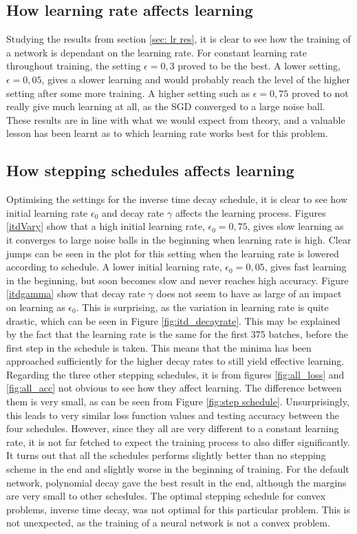 \documentclass{article}
\begin{document}
\subsection{How learning rate affects learning}
Studying the results from section \ref{sec: lr res}, it is clear to see how the training of a network is dependant on the learning rate. For constant learning rate throughout training, the setting $\epsilon=0,3$ proved to be the best. A lower setting, $\epsilon = 0,05$, gives a slower learning and would probably reach the level of the higher setting after some more training. A higher setting such as $\epsilon = 0,75$ proved to not really give much learning at all, as the SGD converged to a large noise ball. These results are in line with what we would expect from theory, and a valuable lesson has been learnt as to which learning rate works best for this problem. 

\subsection{How stepping schedules affects learning}
Optimising the settings for the inverse time decay schedule, it is clear to see how initial learning rate $\epsilon_0$ and decay rate $\gamma$ affects the learning process. Figures \ref{itdVary} show that a high initial learning rate, $\epsilon_0=0,75$, gives slow learning as it converges to large noise balls in the beginning when learning rate is high. Clear jumps can be seen in the plot for this setting when the learning rate is lowered according to schedule. A lower initial learning rate, $\epsilon_0=0,05$, gives fast learning in the beginning, but soon becomes slow and never reaches high accuracy.  Figure \ref{itdgamma} show that decay rate $\gamma$ does not seem to have as large of an impact on learning as $\epsilon_0$. This is surprising, as the variation in learning rate is quite drastic, which can be seen in Figure \ref{fig:itd_decayrate}. This may be explained by the fact that the learning rate is the same for the first 375 batches, before the first step in the schedule is taken. This means that the minima has been approached sufficiently for the higher decay rates to still yield effective learning.\\

\noindent Regarding the three other stepping schedules, it is from figures \ref{fig:all_loss} and \ref{fig:all_acc} not obvious to see how they affect learning. The difference between them is very small, as can be seen from Figure \ref{fig:step schedule}. Unsurprisingly, this leads to very similar loss function values and testing accuracy between the four schedules. However, since they all are very different to a constant learning rate, it is not far fetched to expect the training process to also differ significantly. It turns out that all the schedules performs slightly better than no stepping scheme in the end and slightly worse in the beginning of training. For the default network, polynomial decay gave the best result in the end, although the margins are very small to other schedules. The optimal stepping schedule for convex problems, inverse time decay, was not optimal for this particular problem. This is not unexpected, as the training of a neural network is not a convex problem.
\end{document}
